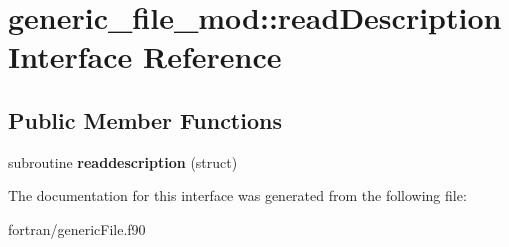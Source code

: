 \hypertarget{interfacegeneric__file__mod_1_1read_description}{}\section{generic\+\_\+file\+\_\+mod\+:\+:read\+Description Interface Reference}
\label{interfacegeneric__file__mod_1_1read_description}
\subsection*{Public Member Functions}
\begin{DoxyCompactItemize}
\item 
\mbox{\label{interfacegeneric__file__mod_1_1read_description_ab103ce07ed398877f1cef93b5f4273c0}} 
subroutine {\bfseries readdescription} (struct)
\end{DoxyCompactItemize}


The documentation for this interface was generated from the following file\+:\begin{DoxyCompactItemize}
\item 
fortran/generic\+File.\+f90\end{DoxyCompactItemize}
